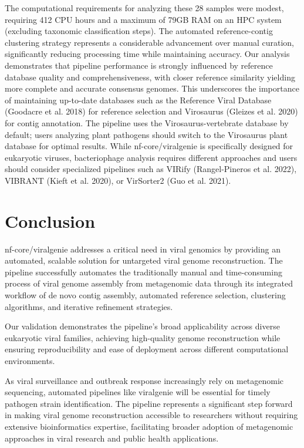The computational requirements for analyzing these 28 samples were modest, requiring 412 CPU hours and a maximum of 79GB RAM on an HPC system (excluding taxonomic classification steps). The automated reference-contig clustering strategy represents a considerable advancement over manual curation, significantly reducing processing time while maintaining accuracy. Our analysis demonstrates that pipeline performance is strongly influenced by reference database quality and comprehensiveness, with closer reference similarity yielding more complete and accurate consensus genomes. This underscores the importance of maintaining up-to-date databases such as the Reference Viral Database (Goodacre et al. 2018) for reference selection and Virosaurus (Gleizes et al. 2020) for contig annotation. The pipeline uses the Virosaurus-vertebrate database by default; users analyzing plant pathogens should switch to the Virosaurus plant database for optimal results. While nf-core/viralgenie is specifically designed for eukaryotic viruses, bacteriophage analysis requires different approaches and users should consider specialized pipelines such as VIRify (Rangel-Pineros et al. 2022), VIBRANT (Kieft et al. 2020), or VirSorter2 (Guo et al. 2021).

\section{Conclusion}

nf-core/viralgenie addresses a critical need in viral genomics by providing an automated, scalable solution for untargeted viral genome reconstruction. The pipeline successfully automates the traditionally manual and time-consuming process of viral genome assembly from metagenomic data through its integrated workflow of de novo contig assembly, automated reference selection, clustering algorithms, and iterative refinement strategies.

Our validation demonstrates the pipeline's broad applicability across diverse eukaryotic viral families, achieving high-quality genome reconstruction while ensuring reproducibility and ease of deployment across different computational environments.

As viral surveillance and outbreak response increasingly rely on metagenomic sequencing, automated pipelines like viralgenie will be essential for timely pathogen strain identification. The pipeline represents a significant step forward in making viral genome reconstruction accessible to researchers without requiring extensive bioinformatics expertise, facilitating broader adoption of metagenomic approaches in viral research and public health applications.

